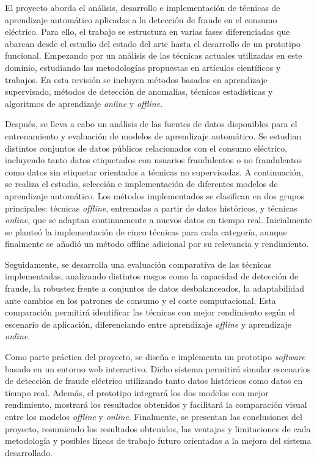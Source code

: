 \documentclass[12pt,a4paper]{report}
\begin{document}
El proyecto aborda el análisis, desarrollo e implementación de técnicas de aprendizaje automático aplicadas a la detección de fraude en el consumo eléctrico. Para ello, el trabajo se estructura en varias fases diferenciadas que abarcan desde el estudio del estado del arte hasta el desarrollo de un prototipo funcional. Empezando por un análisis de las técnicas actuales utilizadas en este dominio, estudiando las metodologías propuestas en artículos científicos y trabajos. En esta revisión se incluyen métodos basados en aprendizaje supervisado, métodos de detección de anomalías, técnicas estadísticas y algoritmos de aprendizaje \emph{online} y \emph{offline}. 

Después, se lleva a cabo un análisis de las fuentes de datos disponibles para el entrenamiento y evaluación de modelos de aprendizaje automático. Se estudian distintos conjuntos de datos públicos relacionados con el consumo eléctrico, incluyendo tanto datos etiquetados con usuarios fraudulentos o no fraudulentos como datos sin etiquetar orientados a técnicas no supervisadas. A continuación, se realiza el estudio, selección e implementación de diferentes modelos de aprendizaje automático. Los métodos implementados se clasifican en dos grupos principales: técnicas \emph{offline}, entrenadas a partir de datos históricos, y técnicas \emph{online}, que se adaptan continuamente a nuevos datos en tiempo real. Inicialmente se planteó la implementación de cinco técnicas para cada categoría, aunque finalmente se añadió un método offline adicional por su relevancia y rendimiento.

Seguidamente, se desarrolla una evaluación comparativa de las técnicas implementadas, analizando distintos rasgos como la capacidad de detección de fraude, la robustez frente a conjuntos de datos desbalanceados, la adaptabilidad ante cambios en los patrones de consumo y el coste computacional. Esta comparación permitirá identificar las técnicas con mejor rendimiento según el escenario de aplicación, diferenciando entre aprendizaje \emph{offline} y aprendizaje \emph{online}.

Como parte práctica del proyecto, se diseña e implementa un prototipo \emph{software} basado en un entorno web interactivo. Dicho sistema permitirá simular escenarios de detección de fraude eléctrico utilizando tanto datos históricos como datos en tiempo real. Además, el prototipo integrará los dos modelos con mejor rendimiento, mostrará los resultados obtenidos y facilitará la comparación visual entre los modelos \emph{offline} y \emph{online}. Finalmente, se presentan las conclusiones del proyecto, resumiendo los resultados obtenidos, las ventajas y limitaciones de cada metodología y posibles líneas de trabajo futuro orientadas a la mejora del sistema desarrollado.
\end{document}
